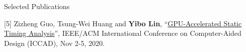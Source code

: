 \begin{rSection}{Selected Publications}
%            
%
%            
%
            

\item[{[5]}]{
        Zizheng Guo, Tsung-Wei Huang and \textbf{Yibo Lin}, 
    ``\href{https://doi.org/10.1145/3400302.3415631}{GPU-Accelerated Static Timing Analysis}'', 
    IEEE/ACM International Conference on Computer-Aided Design (ICCAD), Nov 2-5, 2020.
}
            


\end{rSection}
